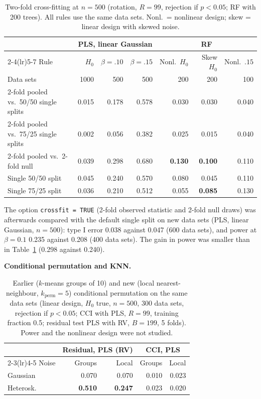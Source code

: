\documentclass[10pt,leqno]{amsart}
\newcommand{\hi}[1]{\textbf{#1}}            %
\newcommand{\fn}[1]{\texttt{#1}}            %
\begin{document}
\begin{table}[H]
\caption{Two-fold cross-fitting at $n=500$ (rotation, $R=99$, rejection if $p<0.05$; RF with 200 trees). All rules use the same data sets. Nonl.\ = nonlinear design; skew = linear design with skewed noise.}
\label{tab:crossfit2}
\scriptsize
\setlength{\tabcolsep}{3pt}
\begin{tabular}{lrrrrrr}
\toprule
 & \multicolumn{3}{c}{PLS, linear Gaussian} & \multicolumn{3}{c}{RF} \\
\cmidrule(lr){2-4}\cmidrule(lr){5-7}
Rule & $H_0$ & $\beta=.10$ & $\beta=.15$ & Nonl.\ $H_0$ & Skew $H_0$ & Nonl.\ $.15$ \\
Data sets & 1000 & 500 & 500 & 200 & 200 & 100 \\
\midrule
2-fold pooled vs.\ 50/50 single splits & 0.015 & 0.178 & 0.578 & 0.030 & 0.030 & 0.040 \\
2-fold pooled vs.\ 75/25 single splits & 0.002 & 0.056 & 0.382 & 0.025 & 0.015 & 0.040 \\
2-fold pooled vs.\ 2-fold null & 0.039 & 0.298 & 0.680 & \hi{0.130} & \hi{0.100} & 0.110 \\
Single 50/50 split & 0.045 & 0.240 & 0.570 & 0.080 & 0.045 & 0.110 \\
Single 75/25 split & 0.036 & 0.210 & 0.512 & 0.055 & \hi{0.085} & 0.130 \\
\bottomrule
\end{tabular}
\end{table}

The option \fn{crossfit = TRUE} (2-fold observed statistic and 2-fold null draws) was
afterwards compared with the default single split on new data sets (PLS, linear
Gaussian, $n=500$): type I error 0.038 against 0.047 (600 data sets), and power at
$\beta=0.1$ 0.235 against 0.208 (400 data sets). The gain in power was smaller than in
Table~\ref{tab:crossfit2} (0.298 against 0.240).

\par\medskip\noindent\textbf{Conditional permutation and KNN.}\par\nopagebreak

\begin{table}[H]
\caption{Earlier ($k$-means groups of 10) and new (local nearest-neighbour,
$k_{\mathrm{perm}}=5$) conditional permutation on the same data sets (linear design,
$H_0$ true, $n=500$, 300 data sets, rejection if $p<0.05$; CCI with PLS, $R=99$,
training fraction 0.5; residual test PLS with RV, $B=199$, 5 folds). Power and the
nonlinear design were not studied.}
\label{tab:localperm}
\footnotesize
\begin{tabular}{lrrrr}
\toprule
 & \multicolumn{2}{c}{Residual, PLS (RV)} & \multicolumn{2}{c}{CCI, PLS} \\
\cmidrule(lr){2-3}\cmidrule(lr){4-5}
Noise & Groups & Local & Groups & Local \\
\midrule
Gaussian  & 0.070 & 0.070 & 0.010 & 0.023 \\
Heterosk. & \hi{0.510} & \hi{0.247} & 0.023 & 0.020 \\
\bottomrule
\end{tabular}
\end{table}
\end{document}
